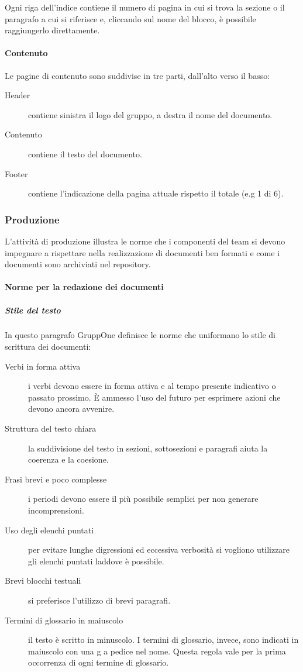 \documentclass[../../norme-di-progetto.tex]{subfiles}
\begin{document}
Ogni riga dell'indice contiene il numero di pagina in cui si trova la sezione o il paragrafo a cui si riferisce e, cliccando sul nome del blocco, è possibile raggiungerlo direttamente.

\paragraph{Contenuto}%
\label{par:contenuto}
Le pagine di contenuto sono suddivise in tre parti, dall'alto verso il basso:
\begin{description}
  \item [Header] contiene sinistra il logo del gruppo, a destra il nome del documento.
  \item [Contenuto] contiene il testo del documento.
  \item [Footer] contiene l'indicazione della pagina attuale rispetto il totale (e.g 1 di 6).
\end{description}


\subsubsection{Produzione}%
\label{subs:produzione}

L'attività di produzione illustra le norme che i componenti del team si devono impegnare a rispettare nella realizzazione di documenti ben formati e come i documenti sono archiviati nel repository.

\paragraph{Norme per la redazione dei documenti}%
\label{par:norme_per_la_redazione_dei_documenti}

\subparagraph{Stile del testo}%
\label{subp:stile_del_testo}
In questo paragrafo GruppOne definisce le norme che uniformano lo stile di scrittura dei documenti:
\begin{description}
  \item [Verbi in forma attiva] i verbi devono essere in forma attiva e al tempo presente indicativo o passato prossimo. È ammesso l'uso del futuro per esprimere azioni che devono ancora avvenire.
  \item [Struttura del testo chiara] la suddivisione del testo in sezioni, sottosezioni e paragrafi aiuta la coerenza e la coesione.
  \item [Frasi brevi e poco complesse] i periodi devono essere il più possibile semplici per non generare incomprensioni.
  \item [Uso degli elenchi puntati] per evitare lunghe digressioni ed eccessiva verbosità si vogliono utilizzare gli elenchi puntati laddove è possibile.
  \item [Brevi blocchi testuali] si preferisce l'utilizzo di brevi paragrafi.
  \item [Termini di glossario in maiuscolo] il testo è scritto in minuscolo. I termini di glossario, invece, sono indicati in maiuscolo con una g a pedice nel nome. Questa regola vale per la prima occorrenza di ogni termine di glossario.
\end{description}
\end{document}
